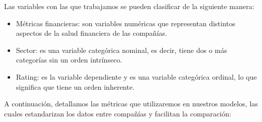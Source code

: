 \documentclass{article}
\begin{document}
Las variables con las que trabajamos se pueden clasificar de la siguiente manera:

\begin{itemize}
    \item Métricas financieras: son variables numéricas que representan distintos aspectos de la salud financiera de las compañías.
    \item Sector: es una variable categórica nominal, es decir, tiene dos o más categorías sin un orden intrínseco.
    \item Rating: es la variable dependiente y es una variable categórica ordinal, lo que significa que tiene un orden inherente.
\end{itemize}

A continuación, detallamos las métricas que utilizaremos en nuestros modelos, las cuales estandarizan los datos entre compañías y facilitan la comparación:
\end{document}
